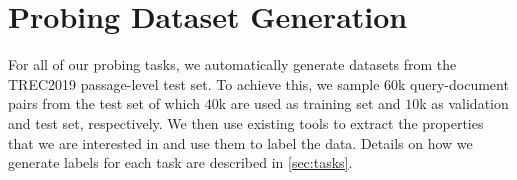 \section{Probing Dataset Generation}
\label{sec:dataset_gen}
For all of our probing tasks, we automatically generate datasets from the TREC2019 passage-level test set. To achieve this, we sample $60$k query-document pairs from the test set of which $40$k are used as training set and $10$k as validation and test set, respectively. We then use existing tools to extract the properties that we are interested in and use them to label the data. Details on how we generate labels for each task are described in \autoref{sec:tasks}. 




